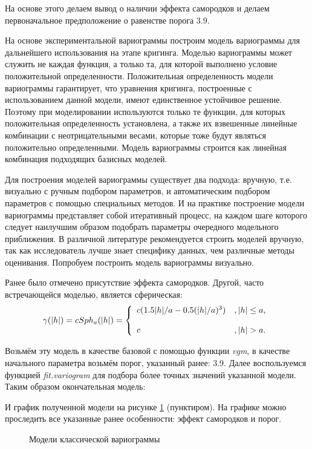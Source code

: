 На основе этого делаем вывод о наличии эффекта самородков и делаем первоначальное предположение о равенстве порога $3.9$.

На основе экспериментальной вариограммы построим модель вариограммы для дальнейшего использования на этапе кригинга. Моделью вариограммы может служить не каждая функция, а только та, для которой выполнено условие положительной определенности. Положительная определенность модели вариограммы гарантирует, что уравнения кригинга, построенные с использованием данной модели, имеют единственное устойчивое решение. Поэтому при моделировании используются только те функции, для которых положительная определенность установлена, а также их взвешенные линейные комбинации с неотрицательными весами, которые тоже будут являться положительно определенными. Модель вариограммы строится как линейная комбинация подходящих базисных моделей.

Для построения моделей вариограммы существует два подхода: вручную, т.е. визуально с ручным подбором параметров, и автоматическим подбором параметров с помощью специальных методов. И на практике построение модели вариограммы  представляет собой итеративный процесс, на каждом шаге которого следует наилучшим образом подобрать параметры очередного модельного приближения. В различной литературе рекомендуется строить моделей вручную, так как исследователь лучше знает специфику данных, чем различные методы оценивания. Попробуем построить модель вариограммы визуально.

Ранее было отмечено присутствие эффекта самородков. Другой, часто встречающейся моделью, является сферическая:
\begin{equation}
	\gamma(\vert h \vert) = c Sph_a(\vert h \vert) = \left\{
 \begin{array}{l l}
   c(1.5 \vert h \vert / a - 0.5(\vert h \vert / a)^3) &, \vert h \vert \le a, \\
   \\
   c &,	 \vert h \vert > a.
 \end{array} \right.
\end{equation}

Возьмём эту модель в качестве базовой с помощью функции \textit{vgm}, в качестве начального параметра возьмём порог, указанный ранее: $3.9$. Далее воспользуемся функцией \textit{fit.variogram} для подбора более точных значений указанной модели. Таким образом окончательная модель:

И график полученной модели на рисунке \ref{img:var-models} (пунктиром). На графике можно проследить все указанные ранее особенности: эффект самородков и порог.
\begin{figure}[ht]
\caption{Модели классической вариограммы}
\label{img:var-models}
\end{figure}

